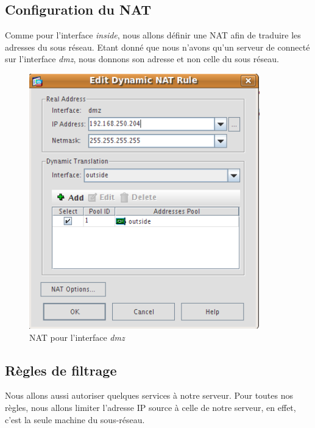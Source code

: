 \documentclass[a4paper,12pt]{article}
\begin{document}
\subsection{Configuration du NAT}
Comme pour l'interface \textit{inside}, nous allons définir une NAT afin de traduire les adresses du sous réseau. Etant donné que nous n'avons qu'un serveur
de connecté sur l'interface \textit{dmz}, nous donnons son adresse et non celle du sous réseau.
\begin{figure}[H]
	\center
	\includegraphics[width=10cm]{img/11-natdmzoutside.png}
	\caption{NAT pour l'interface \textit{dmz}}
\end{figure}

\subsection{Règles de filtrage}
Nous allons aussi autoriser quelques services à notre serveur. Pour toutes nos règles, nous allons limiter l'adresse IP source à celle de notre serveur, en effet,
c'est la seule machine du sous-réseau.
\end{document}
